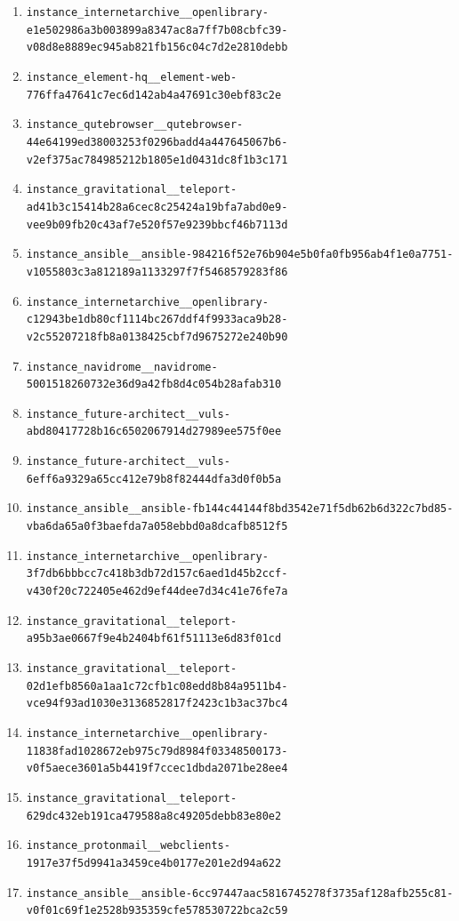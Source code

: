 \documentclass{llmxive}
\begin{document}
\begin{enumerate}
\item \texttt{instance\_internetarchive\_\_openlibrary-e1e502986a3b003899a8347ac8a7ff7b08cbfc39-v08d8e8889ec945ab821fb156c04c7d2e2810debb}
\item \texttt{instance\_element-hq\_\_element-web-776ffa47641c7ec6d142ab4a47691c30ebf83c2e}
\item \texttt{instance\_qutebrowser\_\_qutebrowser-44e64199ed38003253f0296badd4a447645067b6-v2ef375ac784985212b1805e1d0431dc8f1b3c171}
\item \texttt{instance\_gravitational\_\_teleport-ad41b3c15414b28a6cec8c25424a19bfa7abd0e9-vee9b09fb20c43af7e520f57e9239bbcf46b7113d}
\item \texttt{instance\_ansible\_\_ansible-984216f52e76b904e5b0fa0fb956ab4f1e0a7751-v1055803c3a812189a1133297f7f5468579283f86}
\item \texttt{instance\_internetarchive\_\_openlibrary-c12943be1db80cf1114bc267ddf4f9933aca9b28-v2c55207218fb8a0138425cbf7d9675272e240b90}
\item \texttt{instance\_navidrome\_\_navidrome-5001518260732e36d9a42fb8d4c054b28afab310}
\item \texttt{instance\_future-architect\_\_vuls-abd80417728b16c6502067914d27989ee575f0ee}
\item \texttt{instance\_future-architect\_\_vuls-6eff6a9329a65cc412e79b8f82444dfa3d0f0b5a}
\item \texttt{instance\_ansible\_\_ansible-fb144c44144f8bd3542e71f5db62b6d322c7bd85-vba6da65a0f3baefda7a058ebbd0a8dcafb8512f5}
\item \texttt{instance\_internetarchive\_\_openlibrary-3f7db6bbbcc7c418b3db72d157c6aed1d45b2ccf-v430f20c722405e462d9ef44dee7d34c41e76fe7a}
\item \texttt{instance\_gravitational\_\_teleport-a95b3ae0667f9e4b2404bf61f51113e6d83f01cd}
\item \texttt{instance\_gravitational\_\_teleport-02d1efb8560a1aa1c72cfb1c08edd8b84a9511b4-vce94f93ad1030e3136852817f2423c1b3ac37bc4}
\item \texttt{instance\_internetarchive\_\_openlibrary-11838fad1028672eb975c79d8984f03348500173-v0f5aece3601a5b4419f7ccec1dbda2071be28ee4}
\item \texttt{instance\_gravitational\_\_teleport-629dc432eb191ca479588a8c49205debb83e80e2}
\item \texttt{instance\_protonmail\_\_webclients-1917e37f5d9941a3459ce4b0177e201e2d94a622}
\item \texttt{instance\_ansible\_\_ansible-6cc97447aac5816745278f3735af128afb255c81-v0f01c69f1e2528b935359cfe578530722bca2c59}

\end{enumerate}
\end{document}
